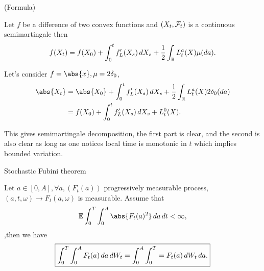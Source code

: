 \begin{thm}{(\itm Formula)} 

Let $f$ be a difference of two convex functions and $(X_t, \mathcal{F}_t)$ is a continuous semimartingale then
\begin{equation*}
    f(X_t) = f(X_0) + \int_0^t f_L'(X_s) \mathop{}\!d X_s + \frac{1}{2} \int_{\mathbb{R}} L_t^a(X) \mu(\mathop{}\!d a).
\end{equation*}
\end{thm}

\begin{example}
Let's consider $f = \abs{x}, \mu = 2\delta_0$,
\begin{align*}
    \abs{X_t} &= \abs{X_0} + \int_0^t f_L'(X_s) \diff X_s + \frac{1}{2} \int_\R L_t^a(X) 2\delta_0(\diff a) \\
    &= f(X_0) + \int_0^t f_L'(X_s) \diff X_s +  L_t^0(X).
\end{align*}
\end{example}

\begin{rem}
This gives semimartingale decomposition, the first part is clear, and the second is also clear as long as one notices local time is monotonic in $t$ which implies bounded variation.
\end{rem}


\begin{thm}{Stochastic Fubini theorem}\label{SFT}

Let $a\in [0,A], \forall a, (F_t(a))$ progressively measurable process, $(a,t,\omega)\rightarrow F_t(a,\omega)$ is measurable. Assume that 
\begin{equation*}
    \E\int_0^T\int_0^A \abs{F_t(a)^2} \diff a \diff t < \infty,
\end{equation*} ,then we have
\begin{equation*}
    \boxed{\int_0^T\int_0^A F_t(a) \mathop{}\!d a \mathop{}\!d W_t = \int_0^A\int_0^T =F_t(a)\mathop{}\!d W_t \mathop{}\!d a. }
\end{equation*}
\end{thm}